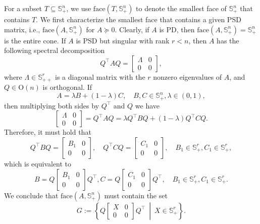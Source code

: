 \documentclass[
]{book}
\theoremstyle{definition}
\theoremstyle{definition}
\theoremstyle{definition}
\theoremstyle{definition}
\theoremstyle{remark}
\begin{document}
For a subset \(T \subseteq \mathbb{S}^{n}_{+}\), we use \(\mathrm{face}(T,\mathbb{S}^{n}_{+})\) to denote the smallest face of \(\mathbb{S}^{n}_{+}\) that contains \(T\). We first characterize the smallest face that contains a given PSD matrix, i.e., \(\mathrm{face}(A,\mathbb{S}^{n}_{+})\) for \(A\succeq 0\). Clearly, if \(A\) is PD, then \(\mathrm{face}(A, \mathbb{S}^{n}_{+}) = \mathbb{S}^{n}_{+}\) is the entire cone. If \(A\) is PSD but singular with rank \(r < n\), then \(A\) has the following spectral decomposition
\[
Q^\top A Q = \begin{bmatrix} \Lambda & 0 \\ 0 & 0 \end{bmatrix},
\]
where \(\Lambda \in \mathbb{S}^{r}_{++}\) is a diagonal matrix with the \(r\) nonzero eigenvalues of \(A\), and \(Q \in \mathrm{O}(n)\) is orthogonal. If
\[
A = \lambda B + (1-\lambda)C, \quad B,C \in \mathbb{S}^{n}_{+},\lambda \in (0,1),
\]
then multiplying both sides by \(Q^\top\) and \(Q\) we have
\[
\begin{bmatrix} \Lambda & 0 \\ 0 & 0 \end{bmatrix} = Q^\top A Q = \lambda Q^\top B Q + (1-\lambda) Q^\top C Q.
\]
Therefore, it must hold that
\[
Q^\top B Q = \begin{bmatrix} B_1 & 0 \\ 0 & 0 \end{bmatrix}, \quad Q^\top C Q = \begin{bmatrix} C_1 & 0 \\ 0 & 0 \end{bmatrix}, \quad B_1 \in \mathbb{S}^{r}_{+}, C_1 \in \mathbb{S}^{r}_{+},
\]
which is equivalent to
\[
B = Q \begin{bmatrix} B_1 & 0 \\ 0 & 0 \end{bmatrix} Q^\top, C = Q \begin{bmatrix} C_1 & 0 \\ 0 & 0 \end{bmatrix} Q^\top, \quad B_1 \in \mathbb{S}^{r}_{+}, C_1 \in \mathbb{S}^{r}_{+}.
\]
We conclude that \(\mathrm{face}(A,\mathbb{S}^{n}_{+})\) must contain the set
\begin{equation}
G:=  \left\{ Q \begin{bmatrix} X & 0 \\ 0 & 0 \end{bmatrix} Q^\top\ \middle\vert\ X \in \mathbb{S}^{r}_{+} \right\} .
\label{eq:face-of-A-psd}
\end{equation}
\end{document}

